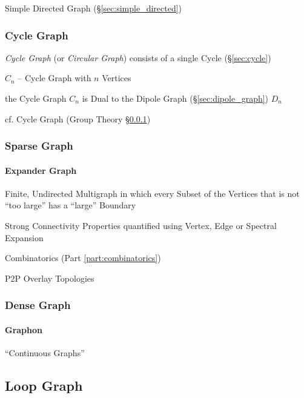 Simple Directed Graph (\S\ref{sec:simple_directed})



\subsubsection{Cycle Graph}\label{sec:cycle_graph}

\emph{Cycle Graph} (or \emph{Circular Graph}) consists of a single Cycle
(\S\ref{sec:cycle})

$C_n$ -- Cycle Graph with $n$ Vertices

the Cycle Graph $C_n$ is Dual to the Dipole Graph (\S\ref{sec:dipole_graph})
$D_n$

cf. Cycle Graph (Group Theory \S\ref{sec:cycle_graph})



\subsubsection{Sparse Graph}\label{sec:sparse_graph}

\paragraph{Expander Graph}\label{sec:expander_graph}\hfill


Finite, Undirected Multigraph in which every Subset of the Vertices that is not
``too large'' has a ``large'' Boundary

Strong Connectivity Properties quantified using Vertex, Edge or Spectral
Expansion

Combinatorics (Part \ref{part:combinatorics})

P2P Overlay Topologies



\subsubsection{Dense Graph}\label{sec:dense_graph}

\paragraph{Graphon}\label{sec:graphon}

``Continuous Graphs''



\subsection{Loop Graph}\label{sec:loop_graph}


